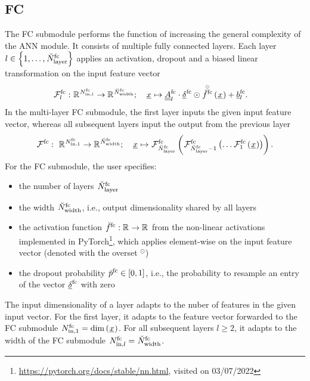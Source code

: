 \subsection*{FC}
The FC submodule performs the function
of increasing the general complexity of the ANN module.
It consists of multiple fully connected layers.
Each layer 
$ l \in \setOfInts{1, \dots, \fcLayer}$ 
applies
an activation, 
dropout
and a biased linear transformation
on the input feature vector
\begin{align} \label{eq:fc_layer}
    \fcMap{l}
    :\ &
    \R{\fcIn{l}} \rightarrow \R{\fcOut}
    ;\quad 
    \featvec[]{}{}{}{} \mapsto
    \fcMat{l} \cdot \fcDropout \odot
    \hadfct{\fcAct} \left(\featvec[]{}{}{}{}\right)
    + \fcBias{l}
    .
\end{align}
In the multi-layer FC submodule, the first layer inputs 
the given input feature vector,
whereas all subsequent layers input the output from the previous layer
\begin{align} \label{eq:fc}
    \fcMap{}
    :\
    \R{\fcIn{1}} \rightarrow \R{\fcOut}
    ;\quad 
    \featvec[]{}{}{}{} \mapsto
    \fcMap{\fcLayer} \tuple{
        \fcMap{\fcLayer - 1} \tuple{
            \dots \fcMap{1} \tuple{
                \featvec[]{}{}{}{}
            }
        }    
    }
    .
\end{align}
For the FC submodule,
the user specifies:
\begin{itemize}
    \item the number of layers $\fcLayer$
    \item the width $\fcOut$, i.e., output dimensionality shared by all layers
    \item the activation function $\fcAct : \R{} \rightarrow \R{}$
    from the non-linear activations implemented in PyTorch\footnote{
        \url{https://pytorch.org/docs/stable/nn.html}, visited on 03/07/2022
    },
    which applies element-wise on the input feature vector (denoted with the overset ${}^\odot$)
    \item the dropout probability $\fcDropoutProb \in \setR{0,1}$,
    i.e., the probability to resample an entry of the vector 
    $\fcDropout$ with zero
    
    
\end{itemize}
The input dimensionality of a layer
adapts to the nuber of features in the given input vector.
For the first layer, it adapts to the feature vector
forwarded to the FC submodule
$\fcIn{1} = \dim \left(\featvec[]{}{}{}{}\right)$.
For all subsequent layers $l \ge 2$,
it adapts to the width of the FC submodule $ \fcIn{l} = \fcOut$.
